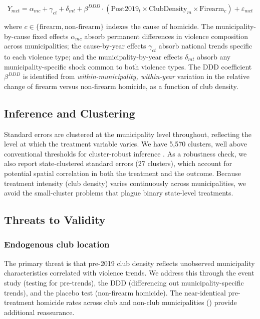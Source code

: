 \documentclass[12pt]{article}
\begin{document}
\begin{equation}
Y_{mct} = \alpha_{mc} + \gamma_{ct} + \delta_{mt} + \beta^{DDD} \cdot (\text{Post2019}_t \times \text{ClubDensity}_m \times \text{Firearm}_c) + \varepsilon_{mct}
\label{eq:ddd}
\end{equation}

\noindent where $c \in \{\text{firearm}, \text{non-firearm}\}$ indexes the cause of homicide. The municipality-by-cause fixed effects $\alpha_{mc}$ absorb permanent differences in violence composition across municipalities; the cause-by-year effects $\gamma_{ct}$ absorb national trends specific to each violence type; and the municipality-by-year effects $\delta_{mt}$ absorb any municipality-specific shock common to both violence types. The DDD coefficient $\beta^{DDD}$ is identified from \textit{within-municipality, within-year} variation in the relative change of firearm versus non-firearm homicide, as a function of club density.

\subsection{Inference and Clustering}

Standard errors are clustered at the municipality level throughout, reflecting the level at which the treatment variable varies. We have 5,570 clusters, well above conventional thresholds for cluster-robust inference \citep{callawaysantanna2021}. As a robustness check, we also report state-clustered standard errors (27 clusters), which account for potential spatial correlation in both the treatment and the outcome. Because treatment intensity (club density) varies continuously across municipalities, we avoid the small-cluster problems that plague binary state-level treatments.

\subsection{Threats to Validity}

\subsubsection*{Endogenous club location} The primary threat is that pre-2019 club density reflects unobserved municipality characteristics correlated with violence trends. We address this through the event study (testing for pre-trends), the DDD (differencing out municipality-specific trends), and the placebo test (non-firearm homicide). The near-identical pre-treatment homicide rates across club and non-club municipalities () provide additional reassurance.
\end{document}
